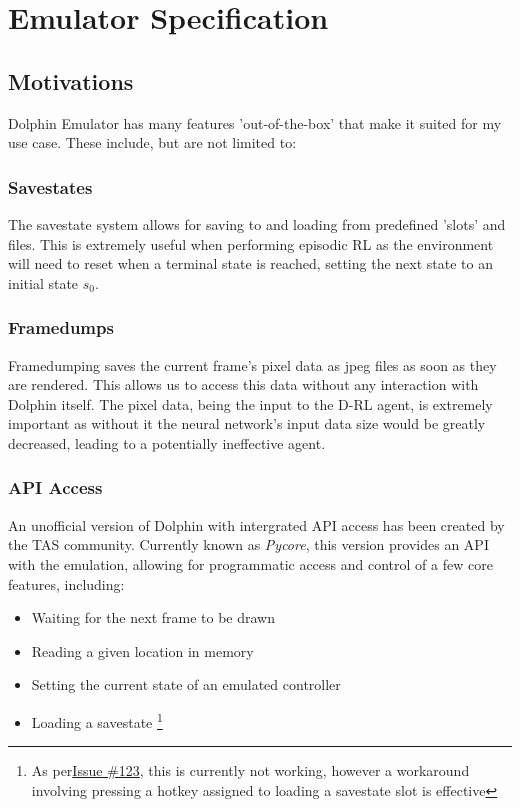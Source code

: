 
\chapter{Emulator Specification}
\section{Motivations}
Dolphin Emulator \cite{DolphinEmulator} has many features 'out-of-the-box' that make it suited for my use case. These include, but are not limited to:
\subsection{Savestates}
The savestate system allows for saving to and loading from predefined 'slots' and files. This is extremely useful when performing episodic RL as the environment will need to  reset when a terminal state is reached, setting the next state to an initial state $s_0$.
\subsection{Framedumps}
Framedumping saves the current frame's pixel data as jpeg files as soon as they are rendered. This allows us to access this data without any interaction with Dolphin itself. The pixel data, being the input to the D-RL agent, is extremely important as without it the neural network's input data size would be greatly decreased, leading to a potentially ineffective agent.
\subsection{API Access}
An unofficial version of Dolphin with intergrated API access has been created by the TAS community. Currently known as \textit{Pycore}\cite{DolphinWithScriptingSupport}, this version provides an API with the emulation, allowing for programmatic access and control of a few core features, including:
\begin{itemize}
    \item Waiting for the next frame to be drawn
    \item Reading a given location in memory
    \item Setting the current state of an emulated controller
    \item Loading a savestate \footnote{As per\href{https://github.com/TASLabz/dolphin/issues/123}{Issue \#123}, this is currently not working, however a workaround involving pressing a hotkey assigned to loading a savestate slot is effective}
\end{itemize}
